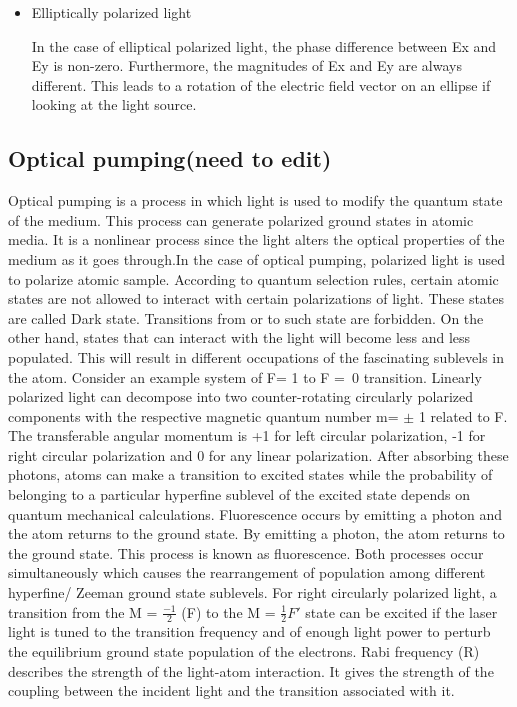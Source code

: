 \begin{itemize}
\item Elliptically polarized light

In the case of elliptical polarized light, the phase difference between Ex and Ey is non-zero. Furthermore, the magnitudes of Ex and Ey are always different. This leads to a rotation of the electric field vector on an ellipse if looking at the light source.
\end{itemize}
\subsection{Optical pumping(need to edit)}
\bigskip
Optical pumping is a process in which light is used to modify the quantum state of the medium. This process can generate polarized ground states in atomic media. It is a nonlinear process since the light alters the optical properties of the medium as it goes through.In the case of optical pumping, polarized light is used to polarize atomic sample. According to quantum selection rules, certain atomic states are not allowed to interact with certain polarizations of light. These states are called Dark state. Transitions from or to such state are forbidden.  On the other hand, states that can interact with the light will become less and less populated. This will result in different occupations of the fascinating sublevels in the atom. Consider an example system of F= 1 to F =~0 transition.  Linearly polarized light can decompose into two counter-rotating circularly polarized components with the respective magnetic quantum number m= $\pm$ 1 related to F. The transferable angular momentum is +1 for left circular polarization, -1 for right circular polarization and 0 for any linear polarization. After absorbing these photons, atoms can make a transition to excited states while the probability of belonging to a particular hyperfine sublevel of the excited state depends on quantum mechanical calculations. Fluorescence occurs by emitting a photon and the atom returns to the ground state. By emitting a photon, the atom returns to the ground state. This process is known as fluorescence. Both processes occur simultaneously which causes the rearrangement of population among different hyperfine/ Zeeman ground state sublevels. For right circularly polarized light, a transition from the M = $\frac{-1}{2}$ (F) to the M = $\frac{1}{2} F' $ state can be excited if the laser light is tuned to the transition frequency and of enough light power to perturb the equilibrium ground state population of the electrons. Rabi frequency (R) describes the strength of the light-atom interaction. It gives the strength of the coupling between the incident light and the transition associated with it.
